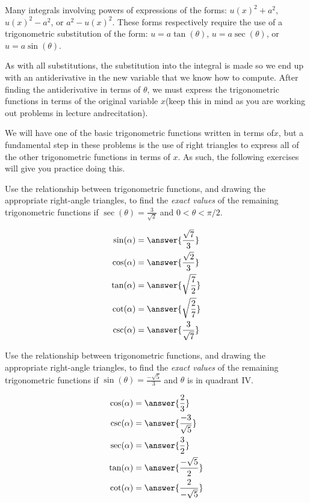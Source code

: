 \documentclass{ximera}
\begin{document}
\begin{problem}
  Many integrals involving powers of expressions of the​ forms: $u(x)^2 + a^2$, $u(x)^2 - a^2$, or $a^2 - u(x)^2$.
  These forms respectively require the use of a trigonometric substitution of the​ form: $u = a \tan(\theta)$, $u = a \sec(\theta)$, or $u = a \sin(\theta)$.
 
  As with all​ substitutions, the substitution into the integral is made so we end up with an antiderivative in the new variable that we know how to compute.
  After finding the antiderivative in terms of $\theta$​, we must express the trigonometric functions in terms of the original variable $x$​ (keep this in mind as you are working out problems in lecture and​ recitation). 
  
  We will have one of the basic trigonometric functions written in terms of​ $x$, but a fundamental step in these problems is the use of right triangles to express all of the other trigonometric functions in terms of $x$.
  As​ such, the following exercises will give you practice doing this.
  
  \begin{multipleChoice}
  \end{multipleChoice}  
\end{problem}

\begin{problem}
  Use the relationship between trigonometric functions, and drawing the appropriate right-angle triangles, to find the \emph{exact values} of the remaining trigonometric functions if $\sec(\theta) = \frac{3}{\sqrt{2}}$ and $0 < \theta < \pi/2$.
  
    \begin{align*}
      \sin(\alpha) &= \answer{\frac{\sqrt{7}}{3}}  \\
      \cos(\alpha) &= \answer{\frac{\sqrt{2}}{3}}  \\
      \tan(\alpha) &= \answer{\sqrt{\frac{7}{2}}}  \\
      \cot(\alpha) &= \answer{\sqrt{\frac{2}{7}}}  \\
      \csc(\alpha) &= \answer{\frac{3}{\sqrt{7}}}
    \end{align*}  
\end{problem}

\begin{problem}
   Use the relationship between trigonometric functions, and drawing the appropriate right-angle triangles, to find the \emph{exact values} of the remaining trigonometric functions if $\sin(\theta) = \frac{-\sqrt{5}}{3}$ and $\theta$ is in quadrant IV.
  
    \begin{align*}
      \cos(\alpha) &= \answer{\frac{2}{3}}  \\
      \csc(\alpha) &= \answer{\frac{-3}{\sqrt{5}}}  \\
      \sec(\alpha) &= \answer{\frac{3}{2}}  \\
      \tan(\alpha) &= \answer{\frac{-\sqrt{5}}{2}}  \\
      \cot(\alpha) &= \answer{\frac{2}{-\sqrt{5}}}
    \end{align*}  
\end{problem}
\end{document}
